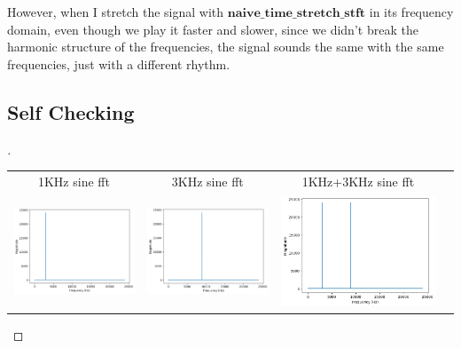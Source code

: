 \documentclass{article}
\begin{document}
However, when I stretch the signal with $\textbf{naive\_time\_stretch\_stft}$ in its
frequency domain, even though we play it faster and slower, since we didn't
break the harmonic structure of the frequencies, the signal sounds the same
with the same frequencies, just with a different rhythm.

\subsection{Self Checking}
\begin{proof}[]
    \centering
    \begin{tabular}{cccc}
        1KHz sine fft & 3KHz sine fft & 1KHz+3KHz sine fft\\
        \includegraphics[width=.3\linewidth]{1kh_fft.png} & \includegraphics[width=.3\linewidth]{3kh_fft.png} & \includegraphics[width=.3\linewidth]{1kh+3kh_fft.png}
    \end{tabular}
\end{proof}
\end{document}
